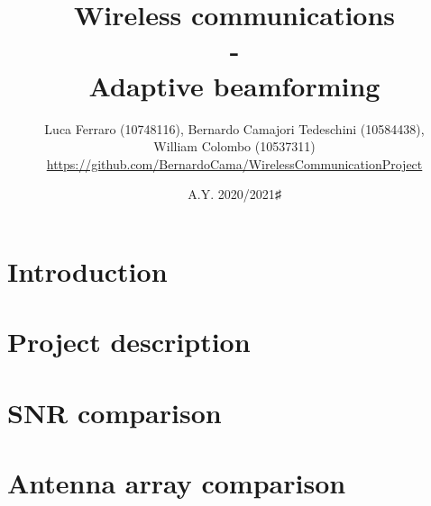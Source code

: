 \documentclass{article}
\title{\textbf{\huge{Wireless communications \\ 
                             - \\ 
                    Adaptive beamforming}}}
\author{Luca Ferraro (10748116), Bernardo Camajori Tedeschini (10584438), \\
            William Colombo (10537311)\\ 
\textcolor{url_blue}{\url{https://github.com/BernardoCama/WirelessCommunicationProject}}}
\date{A.Y. 2020/2021♯}
\begin{document}

\begin{titlingpage}
    \maketitle
\end{titlingpage}

\newpage{}

\tableofcontents
\listoffigures
\lstlistoflistings
\newpage{}

\clearpage
\section{Introduction}
\label{sec:introduction}


\clearpage
\section{Project description}
\label{sec:project}


\clearpage
\section{SNR comparison}
\label{sec:snr_comparison}


\clearpage
\section{Antenna array comparison}
\label{sec:antenna_array_comparison}


\clearpage
\end{document}
